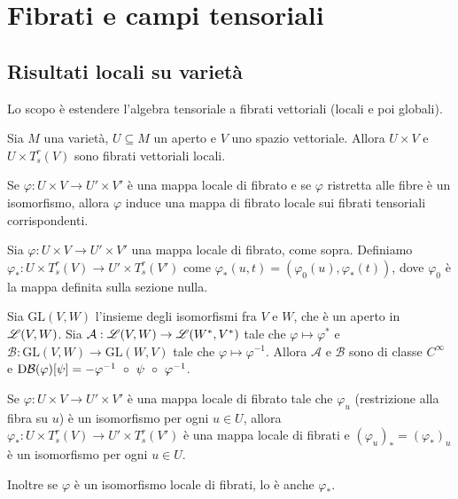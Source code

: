 \chapter{Fibrati e campi tensoriali}

\section{Risultati locali su varietà} %

Lo scopo è estendere l'algebra tensoriale a fibrati vettoriali (locali e poi globali).

Sia $M$ una varietà, $U\subseteq M$ un aperto e $V$ uno spazio vettoriale. Allora $U\times V$ e $U\times T_s^r(V)$ sono fibrati vettoriali locali.

Se $\varphi:U\times V \to U'\times V'$ è una mappa locale di fibrato e se $\varphi$ ristretta alle fibre è un isomorfismo, allora $\varphi$ induce una mappa di fibrato locale sui fibrati tensoriali corrispondenti.

\begin{definition} 
	Sia $\varphi:U\times V \to U'\times V'$ una mappa locale di fibrato, come sopra. Definiamo $\varphi_*: U \times T_s^r(V) \to U'\times T_s^r(V')$ come $\varphi_*(u,t) = (\varphi_0(u), \varphi_*(t))$, dove $\varphi_0$ è la mappa definita sulla sezione nulla.
\end{definition}

\begin{lemma} \label{lem:DualeEInversaRegolari}
	Sia $\mathrm {GL} (V,W)$ l'insieme degli isomorfismi fra $V$ e $W$, che è un aperto in $\mathscr L(V,W)$. Sia $\mathcal A:\mathscr L(V,W)\to \mathscr L(W^*,V^*)$ tale che $\varphi\mapsto \varphi^*$ e $\mathcal B: \mathrm {GL} (V,W) \to \mathrm {GL} (W,V)$ tale che $\varphi \mapsto \varphi^{-1}$.
	Allora $\mathcal A$ e $\mathcal B$ sono di classe $C^\infty$ e $\mathrm D \mathcal B(\varphi)[\psi] = -\varphi^{-1}\ \circ\ \psi\ \circ\ \varphi^{-1}$.
\end{lemma}

\begin{proposition} \label{prop:DaIsomorfismoLocaleFibratiVettAIsomorfismoLocaleFibratiTens}
	Se $\varphi:U\times V\to U'\times V'$ è una mappa locale di fibrato tale che $\varphi_u$ (restrizione alla fibra su $u$) è un isomorfismo per ogni $u\in U$, allora $\varphi_*: U\times T_s^r(V)\to U'\times T_s^r(V')$ è una mappa locale di fibrati e $(\varphi_u)_* = (\varphi_*)_u$ è un isomorfismo per ogni $u\in U$.
	
	Inoltre se $\varphi$ è un isomorfismo locale di fibrati, lo è anche $\varphi_*$.
\end{proposition}

